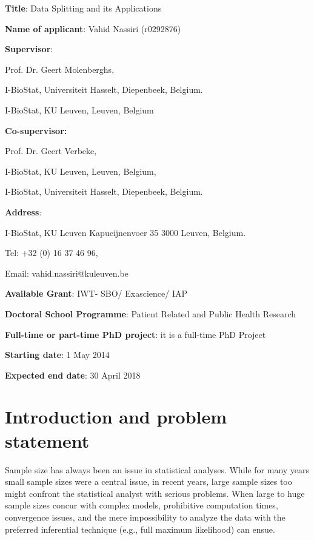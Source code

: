\documentclass[14pt]{article}
\begin{document}
{\large{

\textbf{Title}: {\Large{Data Splitting and its Applications}}
\vspace*{0.5cm}

\textbf{Name of applicant}: {\Large{Vahid Nassiri}} (r0292876)
\vspace*{0.5cm}

\textbf{Supervisor}:

{\Large{Prof. Dr. Geert Molenberghs,}} 

I-BioStat, Universiteit Hasselt, Diepenbeek, Belgium.

I-BioStat, KU Leuven, Leuven, Belgium

\vspace*{0.5cm}

\textbf{Co-supervisor:}

{\Large{Prof. Dr. Geert Verbeke,}}

I-BioStat, KU Leuven, Leuven, Belgium,

I-BioStat, Universiteit Hasselt, Diepenbeek, Belgium.

\vspace*{0.5cm}
\textbf{Address}: 

I-BioStat, KU Leuven
Kapucijnenvoer 35 3000 Leuven, Belgium. 

Tel: +32 (0) 16 37 46 96, 

Email: vahid.nassiri@kuleuven.be

\vspace*{0.5cm}
\textbf{Available Grant}: IWT- SBO/ Exascience/ IAP 

\vspace*{0.5cm}
\textbf{Doctoral School Programme}: Patient Related and Public Health Research
\vspace*{0.5cm}

\textbf{Full-time or part-time PhD project}: it is a full-time PhD Project 

\vspace*{0.5cm}
\textbf{Starting date}: 1 May 2014 

\vspace*{0.5cm}
\textbf{Expected end date}: 30 April 2018}}




\newpage


\section{Introduction and problem statement}
\label{sec_intro}
Sample size has always been an issue in statistical analyses. While for many years small sample sizes were a central issue, in recent years, large sample sizes too might confront the statistical analyst with serious problems. When large to huge sample sizes concur with complex models, prohibitive computation times, convergence issues, and the mere impossibility to analyze the data with the preferred inferential technique (e.g., full maximum likelihood) can ensue. 
\end{document}
